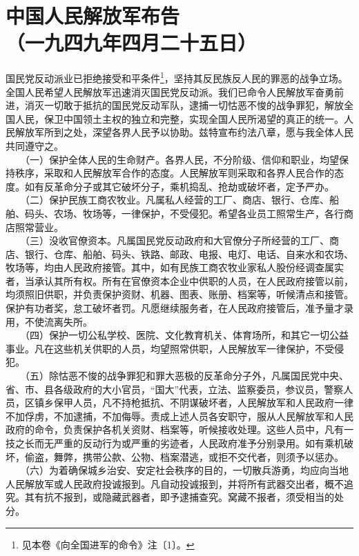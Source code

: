 \documentclass[cn,11pt,chinese]{elegantbook}
\def\myformat#1{\hfil\hfil #1}
\begin{document}
\newpage\section*{\myformat{中国人民解放军布告}\\\myformat{（一九四九年四月二十五日）}}
国民党反动派业已拒绝接受和平条件\footnote[1]{ 见本卷《向全国进军的命令》注〔1〕。}，坚持其反民族反人民的罪恶的战争立场。全国人民希望人民解放军迅速消灭国民党反动派。我们已命令人民解放军奋勇前进，消灭一切敢于抵抗的国民党反动军队，逮捕一切怙恶不悛的战争罪犯，解放全国人民，保卫中国领土主权的独立和完整，实现全国人民所渴望的真正的统一。人民解放军所到之处，深望各界人民予以协助。兹特宣布约法八章，愿与我全体人民共同遵守之。\\
　　（一）保护全体人民的生命财产。各界人民，不分阶级、信仰和职业，均望保持秩序，采取和人民解放军合作的态度。人民解放军则采取和各界人民合作的态度。如有反革命分子或其它破坏分子，乘机捣乱、抢劫或破坏者，定予严办。\\
　　（二）保护民族工商农牧业。凡属私人经营的工厂、商店、银行、仓库、船舶、码头、农场、牧场等，一律保护，不受侵犯。希望各业员工照常生产，各行商店照常营业。\\
　　（三）没收官僚资本。凡属国民党反动政府和大官僚分子所经营的工厂、商店、银行、仓库、船舶、码头、铁路、邮政、电报、电灯、电话、自来水和农场、牧场等，均由人民政府接管。其中，如有民族工商农牧业家私人股份经调查属实者，当承认其所有权。所有在官僚资本企业中供职的人员，在人民政府接管以前，均须照旧供职，并负责保护资财、机器、图表、账册、档案等，听候清点和接管。保护有功者奖，怠工破坏者罚。凡愿继续服务者，在人民政府接管后，准予量才录用，不使流离失所。\\
　　（四）保护一切公私学校、医院、文化教育机关、体育场所，和其它一切公益事业。凡在这些机关供职的人员，均望照常供职，人民解放军一律保护，不受侵犯。\\
　　（五）除怙恶不悛的战争罪犯和罪大恶极的反革命分子外，凡属国民党中央、省、市、县各级政府的大小官员，“国大”代表，立法、监察委员，参议员，警察人员，区镇乡保甲人员，凡不持枪抵抗、不阴谋破坏者，人民解放军和人民政府一律不加俘虏，不加逮捕，不加侮辱。责成上述人员各安职守，服从人民解放军和人民政府的命令，负责保护各机关资财、档案等，听候接收处理。这些人员中，凡有一技之长而无严重的反动行为或严重的劣迹者，人民政府准予分别录用。如有乘机破坏，偷盗，舞弊，携带公款、公物、档案潜逃，或拒不交代者，则须予以惩办。\\
　　（六）为着确保城乡治安、安定社会秩序的目的，一切散兵游勇，均应向当地人民解放军或人民政府投诚报到。凡自动投诚报到，并将所有武器交出者，概不追究。其有抗不报到，或隐藏武器者，即予逮捕查究。窝藏不报者，须受相当的处分。\\
\end{document}
